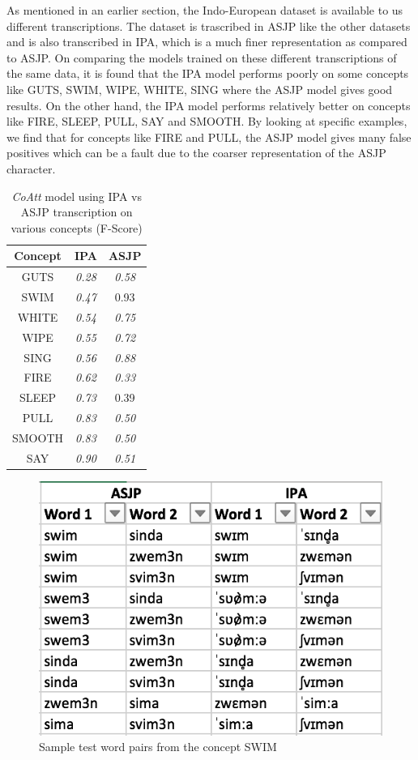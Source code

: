 \documentclass[11pt,letterpaper]{article}
\begin{document}
As mentioned in an earlier section, the Indo-European dataset is available to us different transcriptions. The dataset is trascribed in ASJP like the other datasets and is also transcribed in IPA, which is a much finer representation as compared to ASJP. On comparing the models trained on these different transcriptions of the same data, it is found that the IPA model performs poorly on some concepts like GUTS, SWIM, WIPE, WHITE, SING where the ASJP model gives good results. On the other hand, the IPA model performs relatively better on concepts like FIRE, SLEEP, PULL, SAY and SMOOTH. By looking at specific examples, we find that for concepts like FIRE and PULL, the ASJP model gives many false positives which can be a fault due to the coarser representation of the ASJP character.

\begin{table}[h]
\centering
\begin{tabular}{ccc}
\textbf{Concept} & \textbf{IPA}  & \textbf{ASJP} \\ \hline
GUTS             & \textit{0.28} & \textit{0.58} \\
SWIM             & \textit{0.47} & 0.93          \\
WHITE            & \textit{0.54} & \textit{0.75} \\
WIPE             & \textit{0.55} & \textit{0.72} \\
SING             & \textit{0.56} & \textit{0.88} \\ \hline
FIRE             & \textit{0.62} & \textit{0.33} \\
SLEEP            & \textit{0.73} & 0.39          \\
PULL             & \textit{0.83} & \textit{0.50} \\
SMOOTH           & \textit{0.83} & \textit{0.50} \\
SAY              & \textit{0.90} & \textit{0.51}
\end{tabular}
\caption{\textit{CoAtt} model using IPA vs ASJP transcription on various concepts (F-Score)}
\end{table}

\begin{figure}[t]
\centering
  \includegraphics[width=.9\linewidth]{swim}
  \caption{Sample test word pairs from the concept SWIM}
  \label{disssim}
\end{figure}
\end{document}
